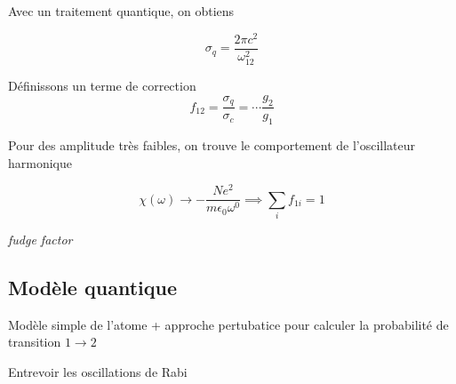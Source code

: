 Avec un traitement quantique, on obtiens

$$\sigma_q = \frac{2\pi{}c^{2}}{\omega_{12}^{2}} $$ 

Définissons un terme de correction $$f_{12} = \frac{\sigma_{q}}{\sigma_{c}} =  \dotsb \frac{g_2}{g_1}  $$ 


Pour des amplitude très faibles, on trouve le comportement de l'oscillateur harmonique 

$$\chi (\omega) \to - \frac{N e^2}{m \epsilon_0 \omega^{0}} \implies \sum_{i} f_{1i} = 1 $$ 

\textit{fudge factor}


\subsection{Modèle quantique}


Modèle simple de l'atome + approche pertubatice pour calculer la probabilité de transition $1 \to 2$ 

Entrevoir les oscillations de Rabi






